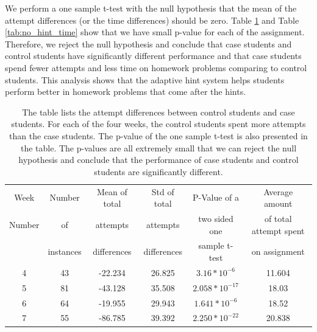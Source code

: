 \documentclass{llncs2e/llncs}
\begin{document}
We perform a one sample t-test with the null hypothesis that the mean of the attempt differences (or the time differences) should be zero. Table \ref{tab:no_hint} and Table \ref{tab:no_hint_time} show that we have small p-value for each of the assignment. Therefore, we reject the null hypothesis and conclude that case students and control students have significantly different performance and that case students spend fewer attempts and less time on homework problems comparing to control students. This analysis shows that the adaptive hint system helps students perform better in homework problems that come after the hints.


\begin{table}[th]
\caption{The table lists the attempt differences between control students and case students. For each of the four weeks, the control students spent more attempts than the case students. The p-value of the one sample t-test is also presented in the table. The p-values are all extremely small that we can reject the null hypothesis and conclude that the performance of case students and control students are significantly different.}
\begin{center}
  \begin{tabular}{| c | c | c | c | c | c |}
  \hline
    Week & Number& Mean of total & Std of total &  P-Value of a &Average amount \\
    Number & of & attempts & attempts & two sided one & of total attempt spent\\
     & instances & differences & differences & sample t-test & on assignment   \\ \hline
	4 & 43 & -22.234 & 26.825 & $3.16 * 10^{-6}$ & 11.604\\
	5 & 81 & -43.128 & 35.508 & $2.058 * 10 ^{-17}$ & 18.03\\
	6 & 64 & -19.955 & 29.943 & $1.641 * 10^{-6}$ &  18.52\\
	7 & 55 & -86.785 & 39.392 & $2.250 * 10^{-22}$ & 20.838\\
	\hline
  \end{tabular}
  \label{tab:no_hint}
  \end{center}
\end{table}
\end{document}

